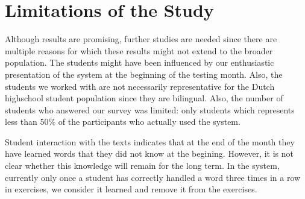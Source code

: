 


\section{Limitations of the Study}
\label{sec:limitations}

Although results are promising, further studies are needed since there are multiple reasons for which these results might not extend to the broader population. 
The students might have been influenced by our enthusiastic presentation of the system at the beginning of the testing month. 
Also, the students we worked with are not necessarily representative for the Dutch highschool student population since they are bilingual. 
Also, the number of students who answered our survey was limited: only \surveyrespondents students which represents less than 50\% of the participants who actually used the system.





Student interaction with the texts indicates that at the end of the month they have learned words that they did not know at the begining. However, it is not clear whether this knowledge will remain for the long term. In the system, currently only once a student has correctly handled a word three times in a row in exercises, we consider it learned and remove it from the exercises. 


